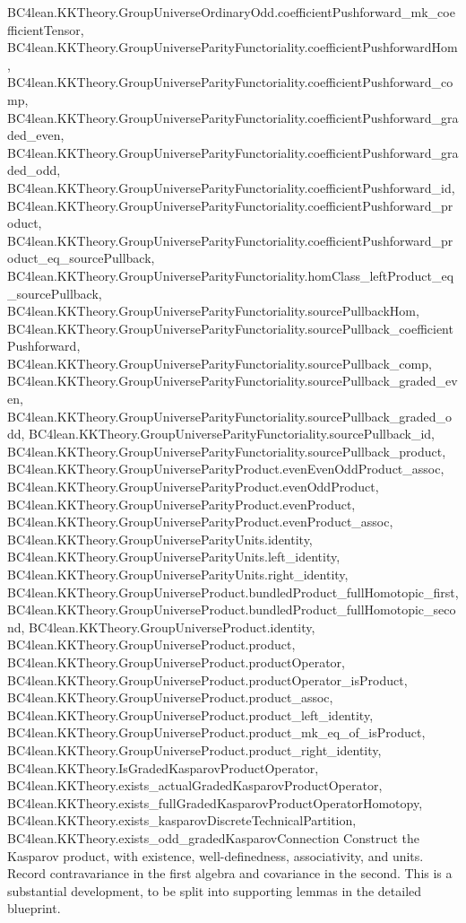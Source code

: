 \begin{proposition}
{BC4lean.KKTheory.GroupUniverseOrdinaryOdd.coefficientPushforward_mk_coefficientTensor,
BC4lean.KKTheory.GroupUniverseParityFunctoriality.coefficientPushforwardHom,
BC4lean.KKTheory.GroupUniverseParityFunctoriality.coefficientPushforward_comp,
BC4lean.KKTheory.GroupUniverseParityFunctoriality.coefficientPushforward_graded_even,
BC4lean.KKTheory.GroupUniverseParityFunctoriality.coefficientPushforward_graded_odd,
BC4lean.KKTheory.GroupUniverseParityFunctoriality.coefficientPushforward_id,
BC4lean.KKTheory.GroupUniverseParityFunctoriality.coefficientPushforward_product,
BC4lean.KKTheory.GroupUniverseParityFunctoriality.coefficientPushforward_product_eq_sourcePullback,
BC4lean.KKTheory.GroupUniverseParityFunctoriality.homClass_leftProduct_eq_sourcePullback,
BC4lean.KKTheory.GroupUniverseParityFunctoriality.sourcePullbackHom,
BC4lean.KKTheory.GroupUniverseParityFunctoriality.sourcePullback_coefficientPushforward,
BC4lean.KKTheory.GroupUniverseParityFunctoriality.sourcePullback_comp,
BC4lean.KKTheory.GroupUniverseParityFunctoriality.sourcePullback_graded_even,
BC4lean.KKTheory.GroupUniverseParityFunctoriality.sourcePullback_graded_odd,
BC4lean.KKTheory.GroupUniverseParityFunctoriality.sourcePullback_id,
BC4lean.KKTheory.GroupUniverseParityFunctoriality.sourcePullback_product,
BC4lean.KKTheory.GroupUniverseParityProduct.evenEvenOddProduct_assoc,
BC4lean.KKTheory.GroupUniverseParityProduct.evenOddProduct,
BC4lean.KKTheory.GroupUniverseParityProduct.evenProduct,
BC4lean.KKTheory.GroupUniverseParityProduct.evenProduct_assoc,
BC4lean.KKTheory.GroupUniverseParityUnits.identity,
BC4lean.KKTheory.GroupUniverseParityUnits.left_identity,
BC4lean.KKTheory.GroupUniverseParityUnits.right_identity,
BC4lean.KKTheory.GroupUniverseProduct.bundledProduct_fullHomotopic_first,
BC4lean.KKTheory.GroupUniverseProduct.bundledProduct_fullHomotopic_second,
BC4lean.KKTheory.GroupUniverseProduct.identity,
BC4lean.KKTheory.GroupUniverseProduct.product,
BC4lean.KKTheory.GroupUniverseProduct.productOperator,
BC4lean.KKTheory.GroupUniverseProduct.productOperator_isProduct,
BC4lean.KKTheory.GroupUniverseProduct.product_assoc,
BC4lean.KKTheory.GroupUniverseProduct.product_left_identity,
BC4lean.KKTheory.GroupUniverseProduct.product_mk_eq_of_isProduct,
BC4lean.KKTheory.GroupUniverseProduct.product_right_identity,
BC4lean.KKTheory.IsGradedKasparovProductOperator,
BC4lean.KKTheory.exists_actualGradedKasparovProductOperator,
BC4lean.KKTheory.exists_fullGradedKasparovProductOperatorHomotopy,
BC4lean.KKTheory.exists_kasparovDiscreteTechnicalPartition,
BC4lean.KKTheory.exists_odd_gradedKasparovConnection}
Construct the Kasparov product, with existence, well-definedness,
associativity, and units. Record contravariance in the first algebra and
covariance in the second. This is a substantial development, to be split
into supporting lemmas in the detailed blueprint.
\end{proposition}

